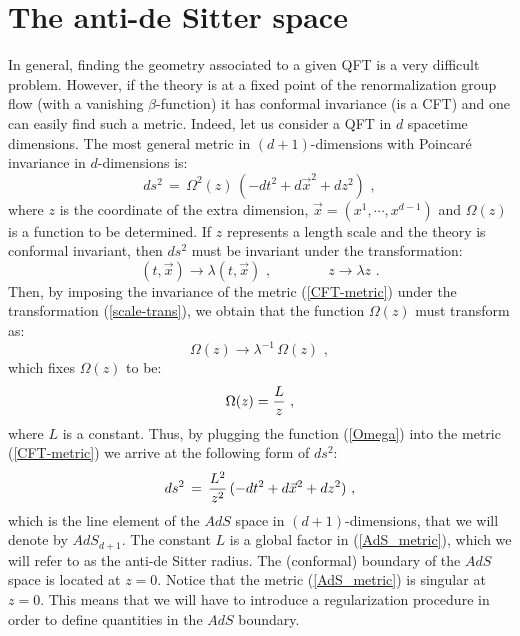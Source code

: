 \documentclass[12pt,notitlepage]{article}
\newcommand{\beq}{\begin{equation}}
\newcommand{\eeq}{\end{equation}}
\begin{document}
\section{The anti-de Sitter space}
\label{sec:2}
In general, finding the geometry associated to a given QFT is a very difficult problem. However, if the theory is at a fixed point of the renormalization group flow (with a vanishing $\beta$-function) it has conformal invariance (is a CFT) and one can easily find such a metric. Indeed,  let us consider a QFT in $d$ spacetime dimensions. 
The most general metric in $(d+1)$-dimensions with Poincar\'e invariance in $d$-dimensions is:
\beq
ds^2\,=\,\Omega^2(z)\,(-dt^2+d\vec x^2+dz^2)\,\,,
\label{CFT-metric}
\eeq
where  $z$  is the coordinate of the  extra dimension, $\vec x=(x^1,\cdots, x^{d-1})$ and 
$\Omega(z)$ is a function to be determined.
If $z$ represents a length scale and the theory is conformal invariant, then $ds^2$ must be invariant under the transformation:
\beq
(t,\vec x)\to \lambda (t,\vec x)\,\,,
\qquad\qquad
z\to \lambda z\,\,.
\label{scale-trans}
\eeq
Then, by imposing  the invariance of  the metric (\ref{CFT-metric}) under the transformation (\ref{scale-trans}), we obtain that the function  $\Omega(z)$ must transform as:
\beq
\Omega(z)\to \lambda^{-1}\,\Omega(z)\,\,,
\eeq
which fixes $\Omega(z)$ to be:
\beq
\Omega(z)={L\over z}\,\,,
\label{Omega}
\eeq
where $L$ is a constant. Thus, by plugging the function (\ref{Omega}) into  the metric (\ref{CFT-metric}) we arrive at the following form of $ds^2$: 
\beq
ds^2\,=\,{L^2\over z^2}\,(-dt^2+d\vec x^2+dz^2)\,\,,
\label{AdS_metric}
\eeq
which is the line element of the $AdS$ space  in $(d+1)$-dimensions, that we will denote by $AdS_{d+1}$.  The constant $L$ is a global factor in (\ref{AdS_metric}), which we will refer to as the anti-de Sitter radius. 
The (conformal) boundary of the $AdS$ space is located at $z=0$. Notice that the metric (\ref{AdS_metric}) is singular at $z=0$. This means that  we will have to introduce a regularization procedure in order to define quantities in the $AdS$ boundary. 
\end{document}
